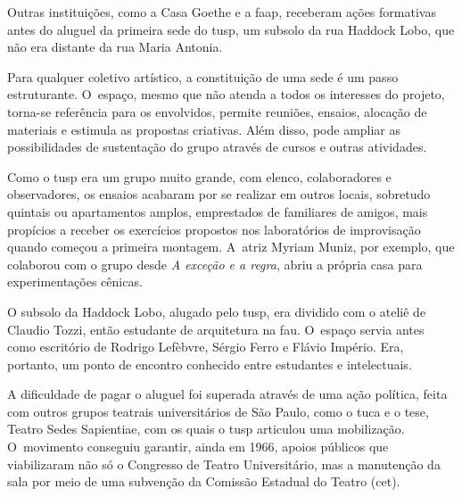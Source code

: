 Outras instituições, como a Casa Goethe e a {\sc faap}, receberam ações
formativas antes do aluguel da primeira sede do {\sc tusp}, um subsolo da rua
Haddock Lobo, que não era distante da rua Maria Antonia.

Para qualquer coletivo artístico, a constituição de uma sede é um passo
estruturante. O~espaço, mesmo que não atenda a todos os interesses do
projeto, torna-se referência para os envolvidos, permite reuniões,
ensaios, alocação de materiais e estimula as propostas criativas. Além
disso, pode ampliar as possibilidades de sustentação do grupo através de
cursos e outras atividades.

Como o {\sc tusp} era um grupo muito grande, com elenco, colaboradores e
observadores, os ensaios acabaram por se realizar em outros locais,
sobretudo quintais ou apartamentos amplos, emprestados de familiares de
amigos, mais propícios a receber os exercícios propostos nos
laboratórios de improvisação quando começou a primeira montagem. A~atriz
Myriam Muniz, por exemplo, que colaborou com o grupo desde {\it A
exceção e a regra}, abriu a própria casa para experimentações cênicas.

O subsolo da Haddock Lobo, alugado pelo {\sc tusp}, era dividido com o ateliê
de Claudio Tozzi, então estudante de arquitetura na {\sc fau}. O~espaço servia
antes como escritório de Rodrigo Lefèbvre, Sérgio Ferro e Flávio
Império. Era, portanto, um ponto de encontro conhecido entre estudantes
e intelectuais.


A dificuldade de pagar o aluguel foi superada através de uma ação
política, feita com outros grupos teatrais universitários de São Paulo,
como o {\sc tuca} e o {\sc tese}, Teatro Sedes Sapientiae, com os quais o {\sc tusp}
articulou uma mobilização. O~movimento conseguiu garantir, ainda em
1966, apoios públicos que viabilizaram não só o Congresso de Teatro
Universitário, mas a manutenção da sala por meio de uma subvenção da
Comissão Estadual do Teatro ({\sc cet}).

